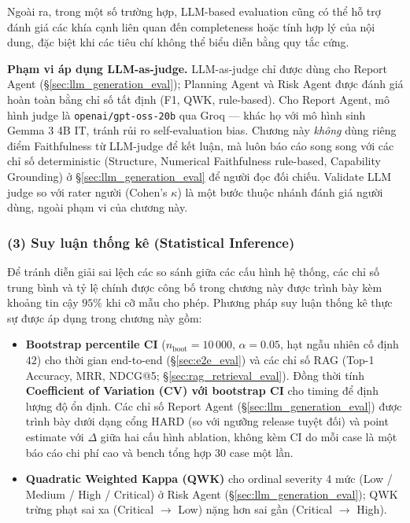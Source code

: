 Ngoài ra, trong một số trường hợp, LLM-based evaluation cũng có thể hỗ trợ đánh giá các khía cạnh liên quan đến completeness hoặc tính hợp lý của nội dung, đặc biệt khi các tiêu chí không thể biểu diễn bằng quy tắc cứng.

\textbf{Phạm vi áp dụng LLM-as-judge.} LLM-as-judge chỉ được dùng cho Report Agent (\S\ref{sec:llm_generation_eval}); Planning Agent và Risk Agent được đánh giá hoàn toàn bằng chỉ số tất định (F1, QWK, rule-based). Cho Report Agent, mô hình judge là \texttt{openai/gpt-oss-20b} qua Groq --- khác họ với mô hình sinh Gemma 3 4B IT, tránh rủi ro self-evaluation bias. Chương này \emph{không} dùng riêng điểm Faithfulness từ LLM-judge để kết luận, mà luôn báo cáo song song với các chỉ số deterministic (Structure, Numerical Faithfulness rule-based, Capability Grounding) ở \S\ref{sec:llm_generation_eval} để người đọc đối chiếu. Validate LLM judge so với rater người (Cohen's $\kappa$) là một bước thuộc nhánh đánh giá người dùng, ngoài phạm vi của chương này.

\subsubsection*{(3) Suy luận thống kê (Statistical Inference)}
\label{subsubsec:stats_methodology}

Để tránh diễn giải sai lệch các so sánh giữa các cấu hình hệ thống, các chỉ số trung bình và tỷ lệ chính được công bố trong chương này được trình bày kèm khoảng tin cậy $95\%$ khi cỡ mẫu cho phép. Phương pháp suy luận thống kê thực sự được áp dụng trong chương này gồm:

\begin{itemize}
    \item \textbf{Bootstrap percentile CI} ($n_{\text{boot}} = 10\,000$, $\alpha = 0.05$, hạt ngẫu nhiên cố định $42$) cho thời gian end-to-end (\S\ref{sec:e2e_eval}) và các chỉ số RAG (Top-1 Accuracy, MRR, NDCG@5; \S\ref{sec:rag_retrieval_eval}). Đồng thời tính \textbf{Coefficient of Variation (CV) với bootstrap CI} cho timing để định lượng độ ổn định. Các chỉ số Report Agent (\S\ref{sec:llm_generation_eval}) được trình bày dưới dạng cổng HARD (so với ngưỡng release tuyệt đối) và point estimate với $\Delta$ giữa hai cấu hình ablation, không kèm CI do mỗi case là một báo cáo chi phí cao và bench tổng hợp 30 case một lần.
    \item \textbf{Quadratic Weighted Kappa (QWK)} cho ordinal severity 4 mức (Low / Medium / High / Critical) ở Risk Agent (\S\ref{sec:llm_generation_eval}); QWK trừng phạt sai xa (Critical $\rightarrow$ Low) nặng hơn sai gần (Critical $\rightarrow$ High).
\end{itemize}

